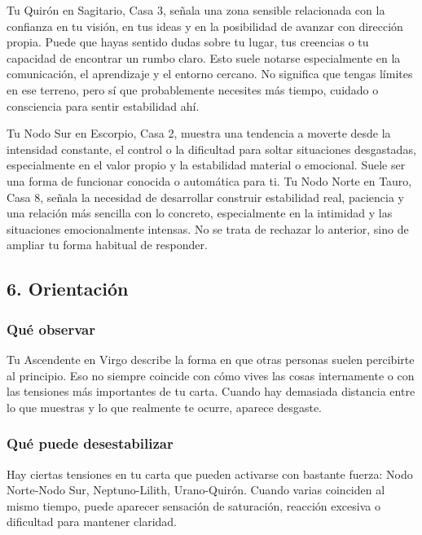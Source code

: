 \documentclass[11pt,a4paper]{article}\usepackage[utf8]{inputenc}
\begin{document}
Tu Quirón en Sagitario, Casa 3, señala una zona sensible relacionada con la confianza en tu visión, en tus ideas y en la posibilidad de avanzar con dirección propia. Puede que hayas sentido dudas sobre tu lugar, tus creencias o tu capacidad de encontrar un rumbo claro. Esto suele notarse especialmente en la comunicación, el aprendizaje y el entorno cercano. No significa que tengas límites en ese terreno, pero sí que probablemente necesites más tiempo, cuidado o consciencia para sentir estabilidad ahí.

\vspace{0.3cm}
Tu Nodo Sur en Escorpio, Casa 2, muestra una tendencia a moverte desde la intensidad constante, el control o la dificultad para soltar situaciones desgastadas, especialmente en el valor propio y la estabilidad material o emocional. Suele ser una forma de funcionar conocida o automática para ti. Tu Nodo Norte en Tauro, Casa 8, señala la necesidad de desarrollar construir estabilidad real, paciencia y una relación más sencilla con lo concreto, especialmente en la intimidad y las situaciones emocionalmente intensas. No se trata de rechazar lo anterior, sino de ampliar tu forma habitual de responder.

\vspace{0.3cm}


\subsection{6. Orientación}

\subsubsection*{Qué observar}
Tu Ascendente en Virgo describe la forma en que otras personas suelen percibirte al principio. Eso no siempre coincide con cómo vives las cosas internamente o con las tensiones más importantes de tu carta. Cuando hay demasiada distancia entre lo que muestras y lo que realmente te ocurre, aparece desgaste.

\subsubsection*{Qué puede desestabilizar}
Hay ciertas tensiones en tu carta que pueden activarse con bastante fuerza: Nodo Norte-Nodo Sur, Neptuno-Lilith, Urano-Quirón. Cuando varias coinciden al mismo tiempo, puede aparecer sensación de saturación, reacción excesiva o dificultad para mantener claridad.
\end{document}
